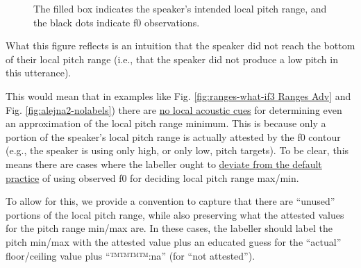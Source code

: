 \documentclass[11pt, twoside]{memoir}
\begin{document}
\begin{figure}[H]
\centering
{}
\caption{The filled box indicates the speaker’s intended local pitch range, and the black dots indicate f0 observations.%
\label{fig:ranges intuition alejna2}%
}
\end{figure}

What this figure reflects is an intuition that the speaker did not reach the bottom of their local pitch range (i.e., that the speaker did not produce a low pitch in this utterance).

This would mean that in examples like Fig. \ref{fig:ranges-what-if3 Ranges Adv} and Fig. \ref{fig:alejna2-nolabels}) there are \uline{no local acoustic cues} for determining even an approximation of the local pitch range minimum. This is because only a portion of the speaker’s local pitch range is actually attested by the f0 contour (e.g., the speaker is using only high, or only low, pitch targets). To be clear, this means there are cases where the labeller ought to \uline{deviate from the default practice} of using observed f0 for deciding local pitch range max\slash min.

To allow for this, we provide a convention to capture that there are “unused” portions of the local pitch range, while also preserving what the attested values for the pitch range min\slash max are. In these cases, the labeller should label the pitch min\slash max with the attested value plus an educated guess for the “actual” floor\slash ceiling value plus “™™™™{:na}” (for “not attested”).
\end{document}
